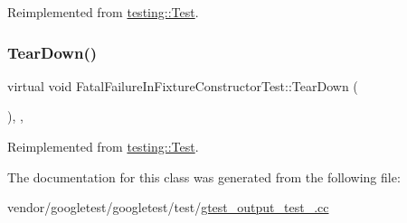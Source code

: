 Reimplemented from \hyperlink{classtesting_1_1_test_a190315150c303ddf801313fd1a777733}{testing\+::\+Test}.

\mbox{\label{class_fatal_failure_in_fixture_constructor_test_a2763026a557e1fce4e59bd16c4eced57}} 
\subsubsection{\texorpdfstring{Tear\+Down()}{TearDown()}}
{\footnotesize\ttfamily virtual void Fatal\+Failure\+In\+Fixture\+Constructor\+Test\+::\+Tear\+Down (\begin{DoxyParamCaption}{ }\end{DoxyParamCaption})\hspace{0.3cm}{\ttfamily [inline]}, {\ttfamily [protected]}, {\ttfamily [virtual]}}



Reimplemented from \hyperlink{classtesting_1_1_test_a5f0ab439802cbe0ef7552f1a9f791923}{testing\+::\+Test}.



The documentation for this class was generated from the following file\+:\begin{DoxyCompactItemize}
\item 
vendor/googletest/googletest/test/\hyperlink{gtest__output__test___8cc}{gtest\+\_\+output\+\_\+test\+\_\+.\+cc}\end{DoxyCompactItemize}
